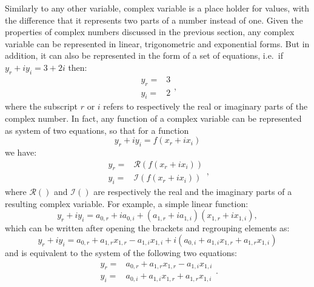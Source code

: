 \documentclass[
]{book}
\begin{document}
Similarly to any other variable, complex variable is a place holder for values, with the difference that it represents two parts of a number instead of one. Given the properties of complex numbers discussed in the previous section, any complex variable can be represented in linear, trigonometric and exponential forms. But in addition, it can also be represented in the form of a set of equations, i.e.~if \(y_r + i y_i = 3+2i\) then:
\begin{equation}
    \begin{aligned}
        y_r = & 3 \\
        y_i = & 2
    \end{aligned} ,
    \label{eq:complexVariablesSystem}
\end{equation}
where the subscript \(r\) or \(i\) refers to respectively the real or imaginary parts of the complex number. In fact, any function of a complex variable can be represented as system of two equations, so that for a function
\begin{equation}
    y_{r} + i y_{i} = f(x_r+ix_i)
    \label{eq:complexFunction}
\end{equation}
we have:
\begin{equation}
    \begin{aligned}
        y_r = & \mathcal{R}(f(x_r+ix_i)) \\
        y_i = & \mathcal{I}(f(x_r+ix_i))
    \end{aligned} ,
    \label{eq:complexFunctionSystem}
\end{equation}
where \(\mathcal{R}()\) and \(\mathcal{I}()\) are respectively the real and the imaginary parts of a resulting complex variable. For example, a simple linear function:
\begin{equation*}
    y_r + i y_i = a_{0,r} + i a_{0,i} + (a_{1,r} + i a_{1,i}) (x_{1,r} + i x_{1,i}),
\end{equation*}
which can be written after opening the brackets and regrouping elements as:
\begin{equation*}
    y_r + i y_i = a_{0,r} + a_{1,r} x_{1,r} - a_{1,i} x_{1,i} + i \left( a_{0,i} + a_{1,i} x_{1,r} + a_{1,r} x_{1,i} \right)
\end{equation*}
and is equivalent to the system of the following two equations:
\begin{equation*}
    \begin{aligned}
        y_r = & a_{0,r} + a_{1,r} x_{1,r} - a_{1,i} x_{1,i} \\
        y_i = & a_{0,i} + a_{1,i} x_{1,r} + a_{1,r} x_{1,i}
    \end{aligned} .
\end{equation*}
\end{document}
